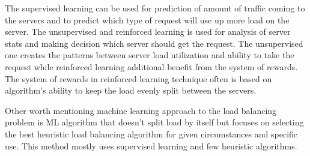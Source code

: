 \documentclass[conference]{IEEEtran}
\begin{document}
The supervised learning can be used for prediction of amount of traffic coming to the servers and to predict which type of request will use up more load on the server\cite{balancing5}.
The unsupervised and reinforced learning is used for analysis of server stats and making decision which server should get the request. The unsupervised one creates the patterns between server load utilization and ability to take the request while reinforced learning additional benefit from the system of rewards. The system of rewards in reinforced learning technique often is based on algorithm's ability to keep the load evenly split between the servers\cite{balancing5}\cite{balancing6}.\par
Other worth mentioning machine learning approach to the load balancing problem is ML algorithm that doesn't split load by itself but focuses on selecting the best heuristic load balancing algorithm for given circumstances and specific use. This method mostly uses supervised learning and few heuristic algorithms\cite{balancing7}.\par
\end{document}
